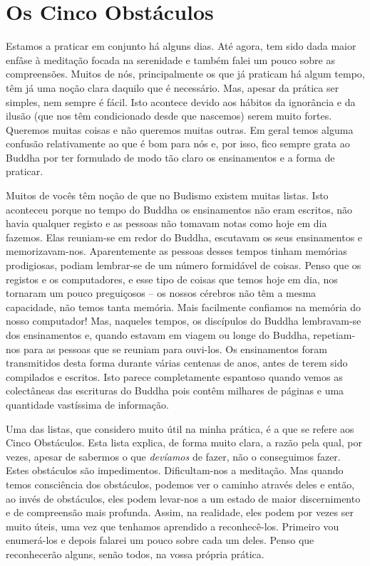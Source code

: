 \chapter{Os Cinco Obstáculos}

Estamos a praticar em conjunto há alguns dias. Até agora, tem sido dada
maior enfâse à meditação focada na serenidade e também falei um pouco
sobre as compreensões. Muitos de nós, principalmente os que já praticam
há algum tempo, têm já uma noção clara daquilo que é necessário. Mas,
apesar da prática ser simples, nem sempre é fácil. Isto acontece devido
aos hábitos da ignorância e da ilusão (que nos têm condicionado desde
que nascemos) serem muito fortes. Queremos muitas coisas e não queremos
muitas outras. Em geral temos alguma confusão relativamente ao que é bom
para nós e, por isso, fico sempre grata ao Buddha por ter formulado de
modo tão claro os ensinamentos e a forma de praticar.

Muitos de vocês têm noção de que no Budismo existem muitas listas. Isto
aconteceu porque no tempo do Buddha os ensinamentos não eram escritos,
não havia qualquer registo e as pessoas não tomavam notas como hoje em
dia fazemos. Elas \mbox{reuniam-se} em redor do Buddha, escutavam os seus
ensinamentos e memorizavam-nos. Aparentemente as pessoas desses tempos
tinham memórias prodigiosas, podiam lembrar-se de um número formidável
de coisas. Penso que os registos e os computadores, e esse tipo de
coisas que temos hoje em dia, nos tornaram um pouco preguiçosos -- os
nossos cérebros não têm a mesma capacidade, não temos tanta memória.
Mais facilmente confiamos na memória do nosso computador! Mas, naqueles
tempos, os discípulos do Buddha lembravam-se dos ensinamentos e, quando
estavam em viagem ou longe do Buddha, repetiam-nos para as pessoas que
se reuniam para ouvi-los. Os ensinamentos foram transmitidos desta forma
durante várias centenas de anos, antes de terem sido compilados e
escritos. Isto parece completamente espantoso quando vemos as
colectâneas das escrituras do Buddha pois contêm milhares de páginas e
uma quantidade vastíssima de informação.

Uma das listas, que considero muito útil na minha prática, é a que se
refere aos Cinco Obstáculos. Esta lista explica, de forma muito clara, a
razão pela qual, por vezes, apesar de sabermos o que \emph{devíamos} de
fazer, não o conseguimos fazer. Estes obstáculos são impedimentos.
Dificultam-nos a meditação. Mas quando temos consciência dos obstáculos,
podemos ver o caminho através deles e então, ao invés de obstáculos,
eles podem levar-nos a um estado de maior discernimento e de compreensão
mais profunda. Assim, na realidade, eles podem por vezes ser muito
úteis, uma vez que tenhamos aprendido a reconhecê-los. Primeiro vou
\mbox{enumerá-los} e depois falarei um pouco sobre cada um deles. Penso que
reconhecerão alguns, senão todos, na vossa própria prática.

